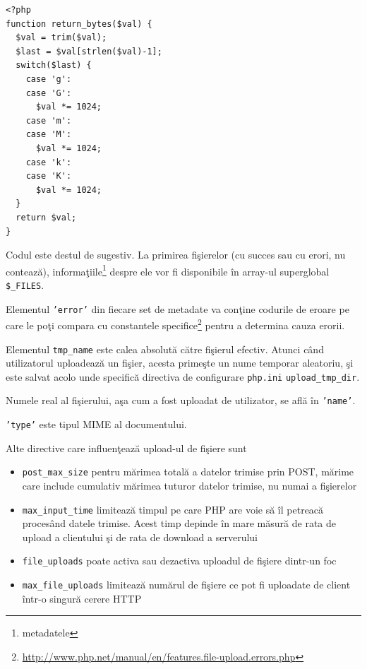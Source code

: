 \begin{lstlisting}[title=functions.php]
<?php
function return_bytes($val) {
  $val = trim($val);
  $last = $val[strlen($val)-1];
  switch($last) {
	case 'g':
	case 'G':
	  $val *= 1024;
	case 'm':
	case 'M':
	  $val *= 1024;
	case 'k':
	case 'K':
	  $val *= 1024;
  }
  return $val;
}
\end{lstlisting}
Codul este destul de sugestiv. La primirea fişierelor (cu succes sau cu erori, nu
contează), informaţiile\footnote{metadatele} despre ele vor fi disponibile
în array-ul superglobal \texttt{\$\_FILES}.

Elementul \texttt{'error'} din fiecare set de metadate va conţine
codurile de eroare pe care le poţi compara
cu constantele specifice\footnote{\url{http://www.php.net/manual/en/features.file-upload.errors.php}}
pentru a determina cauza erorii.


Elementul \texttt{tmp\_name} este calea absolută către fişierul efectiv.
Atunci când utilizatorul uploadează un fişier, acesta primeşte un nume
temporar aleatoriu, şi este salvat acolo unde specifică
directiva de configurare \texttt{php.ini} \texttt{upload\_tmp\_dir}.

Numele real al fişierului, aşa cum a fost uploadat de utilizator,
se află în \texttt{'name'}.

\texttt{'type'} este tipul MIME al documentului.

Alte directive care influenţează upload-ul de fişiere sunt
\begin{itemize}
\item \texttt{post\_max\_size} pentru mărimea totală a datelor trimise prin POST, mărime care include
	  cumulativ mărimea tuturor datelor trimise, nu numai a fişierelor
\item \texttt{max\_input\_time} limitează timpul pe care PHP are voie să îl petreacă
  procesând datele trimise. Acest timp depinde în mare măsură de rata de upload
  a clientului şi de rata de download a serverului
\item \texttt{file\_uploads} poate activa sau dezactiva uploadul de fişiere dintr-un foc
\item \texttt{max\_file\_uploads} limitează numărul de fişiere ce pot fi uploadate de
  client într-o singură cerere HTTP
\end{itemize}

